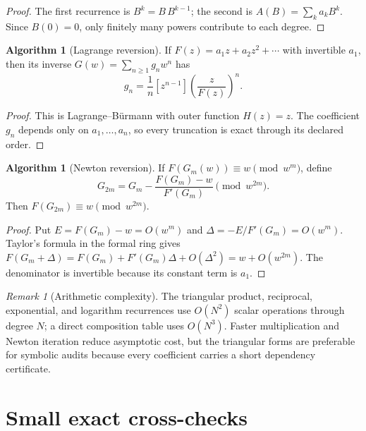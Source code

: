 \documentclass[11pt,a4paper,oneside,openany]{book}
\theoremstyle{definition}
\newtheorem{algorithm}[theorem]{Algorithm}
\theoremstyle{remark}
\newtheorem{remark}[theorem]{Remark}
\begin{document}
\begin{proof}
The first recurrence is $B^k=B\,B^{k-1}$; the second is
$A(B)=\sum_ka_kB^k$.  Since $B(0)=0$, only finitely many powers contribute to
each degree.
\end{proof}

\begin{algorithm}[Lagrange reversion]
\label{alg:merged-lagrange-reversion}
If $F(z)=a_1z+a_2z^2+\cdots$ with invertible $a_1$, then its inverse
$G(w)=\sum_{n\geq1}g_nw^n$ has
\begin{equation}
 g_n=\frac1n[z^{n-1}]\left(\frac z{F(z)}\right)^n.                 \label{eq:merged-alg-lagrange-reversion}
\end{equation}
\end{algorithm}

\begin{proof}
This is Lagrange--Bürmann with outer function $H(z)=z$.  The coefficient
$g_n$ depends only on $a_1,\ldots,a_n$, so every truncation is exact through
its declared order.
\end{proof}

\begin{algorithm}[Newton reversion]
\label{alg:merged-newton-reversion}
If $F(G_m(w))\equiv w\pmod{w^m}$, define
\begin{equation}
 G_{2m}=G_m-\frac{F(G_m)-w}{F'(G_m)}\pmod{w^{2m}}.                  \label{eq:merged-newton-reversion}
\end{equation}
Then $F(G_{2m})\equiv w\pmod{w^{2m}}$.
\end{algorithm}

\begin{proof}
Put $E=F(G_m)-w=O(w^m)$ and $\Delta=-E/F'(G_m)=O(w^m)$.  Taylor's formula
in the formal ring gives
$F(G_m+\Delta)=F(G_m)+F'(G_m)\Delta+O(\Delta^2)=w+O(w^{2m})$.
The denominator is invertible because its constant term is $a_1$.
\end{proof}

\begin{remark}[Arithmetic complexity]
The triangular product, reciprocal, exponential, and logarithm recurrences use
$O(N^2)$ scalar operations through degree $N$; a direct composition table uses
$O(N^3)$.  Faster multiplication and Newton iteration reduce asymptotic cost,
but the triangular forms are preferable for symbolic audits because every
coefficient carries a short dependency certificate.
\end{remark}

\section{Small exact cross-checks}
\end{document}
